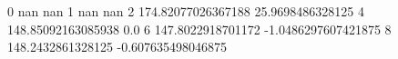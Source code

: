 0 nan nan
1 nan nan
2 174.82077026367188 25.9698486328125
4 148.85092163085938 0.0
6 147.8022918701172 -1.0486297607421875
8 148.2432861328125 -0.607635498046875
